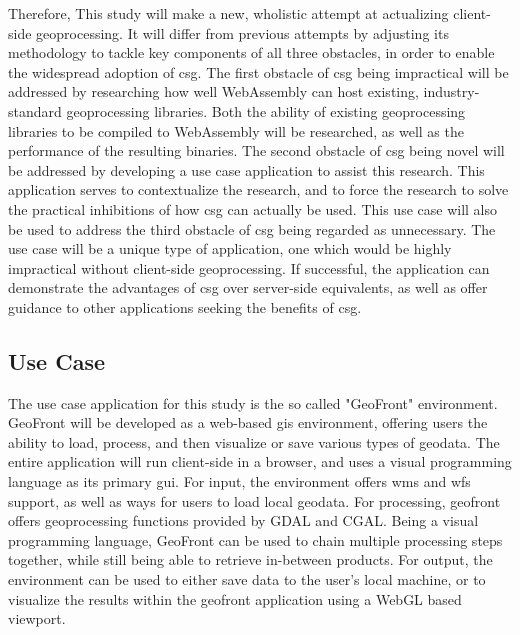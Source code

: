 Therefore, This study will make a new, wholistic attempt at actualizing client-side geoprocessing. It will differ from previous attempts by adjusting its methodology to tackle key components of all three obstacles, in order to enable the widespread adoption of \ac{csg}.
The first obstacle of \ac{csg} being impractical will be addressed by researching how well WebAssembly can host existing, industry-standard geoprocessing libraries. 
Both the ability of existing geoprocessing libraries to be compiled to WebAssembly will be researched, as well as the performance of the resulting binaries.  
The second obstacle of \ac{csg} being novel will be addressed by developing a use case application to assist this research. This application serves to contextualize the research, and to force the research to solve the practical inhibitions of how \ac{csg} can actually be used. 
This use case will also be used to address the third obstacle of \ac{csg} being regarded as unnecessary. The use case will be a unique type of application, one which would be highly impractical without client-side geoprocessing. 
If successful, the application can demonstrate the advantages of \ac{csg} over server-side equivalents, as well as offer guidance to other applications seeking the benefits of \ac{csg}.

\subsection{Use Case}

The use case application for this study is the so called "GeoFront" environment.
GeoFront will be developed as a web-based \ac{gis} environment, offering users the ability to load, process, and then visualize or save various types of geodata. 
The entire application will run client-side in a browser, and uses a visual programming language as its primary \ac{gui}.
For input, the environment offers \ac{wms} and \ac{wfs} support, as well as ways for users to load local geodata.
For processing, geofront offers geoprocessing functions provided by GDAL and CGAL. 
Being a visual programming language, GeoFront can be used to chain multiple processing steps together, while still being able to retrieve in-between products. 
For output, the environment can be used to either save data to the user's local machine, or to visualize the results within the geofront application using a WebGL based viewport.

